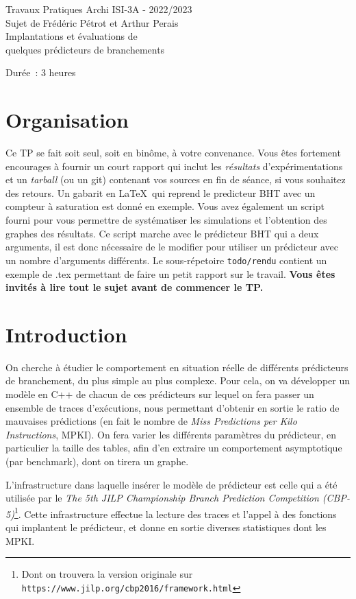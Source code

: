 \documentclass[a4paper]{article}
\begin{document}
\begin{center}
\large
Travaux Pratiques Archi ISI-3A - 2022/2023\\
Sujet de Frédéric Pétrot et Arthur Perais\\
\LARGE
Implantations et évaluations de\\
quelques prédicteurs de branchements\\
\large

Durée~: 3 heures
\end{center}
\section{Organisation}
Ce TP se fait soit seul, soit en binôme, à votre convenance.
Vous êtes fortement encourages à fournir un court rapport qui inclut les \emph{résultats} d'expérimentations et un \emph{tarball} (ou un git) contenant vos sources en fin de séance, si vous souhaitez des retours.
Un gabarit en \LaTeX\ qui reprend le predicteur BHT avec un compteur à saturation est donné en exemple.
Vous avez également un script fourni pour vous permettre de systématiser les simulations et l'obtention des graphes des résultats.
Ce script marche avec le prédicteur BHT qui a deux arguments, il est donc nécessaire de le modifier pour utiliser un prédicteur avec un nombre d'arguments différents.
Le sous-répetoire \verb+todo/rendu+ contient un exemple de .tex permettant de faire un petit rapport sur le travail. \textbf{Vous êtes invités à lire tout le sujet avant de commencer le TP.}

\section{Introduction}
On cherche à étudier le comportement en situation réelle de différents prédicteurs de branchement, du plus simple au plus complexe. Pour cela, on va développer un modèle en C++ de chacun de ces prédicteurs sur lequel on fera passer un ensemble de traces d'exécutions, nous permettant d'obtenir en sortie le ratio de mauvaises prédictions (en fait le nombre de \emph{Miss Predictions per Kilo Instructions}, MPKI). On fera varier les différents paramètres du prédicteur, en particulier la taille des tables, afin d'en extraire un comportement asymptotique (par benchmark), dont on tirera un graphe.

L'infrastructure dans laquelle insérer le modèle de prédicteur est celle qui a été utilisée par le \emph{The 5th JILP Championship Branch Prediction Competition (CBP-5)}\footnote{Dont on trouvera la version originale sur \texttt{https://www.jilp.org/cbp2016/framework.html}}.
Cette infrastructure effectue la lecture des traces et l'appel à des fonctions qui implantent le prédicteur, et donne en sortie diverses statistiques dont les MPKI.
\end{document}
